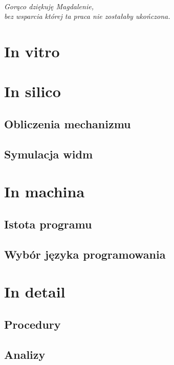 \documentclass[
  a4paper,
  justified,
  nobib,
  marginals=raggedright,
]{tufte-book}
\begin{document}
\frontmatter
\maketitle

\cleardoublepage
\thispagestyle{empty}
~\vfill
\vfill
\begin{fullwidth}
\begin{doublespace}
\raggedleft\noindent\fontsize{16}{20}\selectfont\itshape
\nohyphenation
Gorąco dziękuję Magdalenie,\\
bez wsparcia której ta praca nie zostałaby ukończona.
\end{doublespace}
\end{fullwidth}
\vfill

\tableofcontents



\mainmatter



\chapter{In vitro}

\chapter{In silico}
\section{Obliczenia mechanizmu}
\section{Symulacja widm}

\chapter{In machina}
\section{Istota programu}
\section{Wybór języka programowania}

\chapter{In detail}
\section{Procedury}
\section{Analizy}

\backmatter

\end{document}
